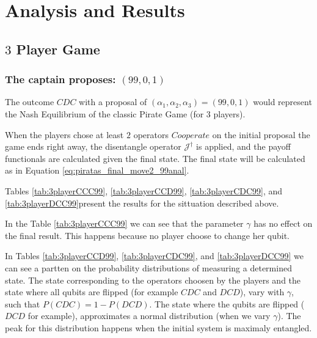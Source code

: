 \section{Analysis and Results}
\label{sec:description_3}


\subsection{$3$ Player Game}
\label{subsec:3playergame}

\subsubsection{The captain proposes: $(99, 0, 1)$}
\label{subsubsec:3playergame99}

The outcome $CDC$ with a proposal of $(\alpha_{1}, \alpha_{2}, \alpha_{3}) =(99, 0, 1)$ would represent the Nash Equilibrium of the classic Pirate Game (for $3$ players). 

When the players chose at least $2$ operators $Cooperate$ on the initial proposal the game ends right away, the disentangle operator $\mathcal{J}^{\dagger}$ is applied, and the payoff functionals are calculated given the final state. The final state will be calculated as in Equation \ref{eq:piratas_final_move2_99anal}. 

Tables \ref{tab:3playerCCC99}, \ref{tab:3playerCCD99}, \ref{tab:3playerCDC99}, and \ref{tab:3playerDCC99}present the results for the sittuation described above.

In the Table \ref{tab:3playerCCC99} we can see that the parameter $\gamma$ has no effect on the final result. This happens because no player choose to change her qubit. 

In Tables \ref{tab:3playerCCD99}, \ref{tab:3playerCDC99}, and \ref{tab:3playerDCC99} we can see a partten on the probability distributions of measuring a determined state. The state corresponding to the operators choosen by the players and the state where all qubits are flipped (for example $CDC$ and $DCD$), vary with $\gamma$, such that $P(CDC)= 1 - P(DCD)$. The state where the qubits are flipped ($DCD$ for example), approximates a normal distribution (when we vary $\gamma$). The peak for this distribution happens when the initial system is maximaly entangled.

